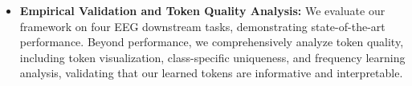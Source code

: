 \begin{itemize}[left=0pt]
    \item \textbf{Empirical Validation and Token Quality Analysis:} We evaluate our framework on four EEG downstream tasks, demonstrating state-of-the-art performance. Beyond performance, we comprehensively analyze token quality, including token visualization, class-specific uniqueness, and frequency learning analysis, validating that our learned tokens are informative and interpretable.
    
    
    
    
    
    
\end{itemize}
 















